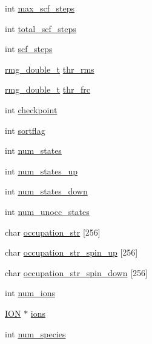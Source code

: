 \begin{DoxyCompactItemize}
int \hyperlink{struct_c_o_n_t_r_o_l_adf06946f4c5be0a3a3604fcf997b128d}{max\-\_\-scf\-\_\-steps}
\item 
int \hyperlink{struct_c_o_n_t_r_o_l_a4fe6222071236e0c16e69bbd8119cce1}{total\-\_\-scf\-\_\-steps}
\item 
int \hyperlink{struct_c_o_n_t_r_o_l_aa6e26afb9102d861d0ee9cd3f8bce47e}{scf\-\_\-steps}
\item 
\hyperlink{rmgtypes_8h_aaa16921c14f121c56eaa42390a340db8}{rmg\-\_\-double\-\_\-t} \hyperlink{struct_c_o_n_t_r_o_l_a9f27da44edf8c8ff3c58e0d905165717}{thr\-\_\-rms}
\item 
\hyperlink{rmgtypes_8h_aaa16921c14f121c56eaa42390a340db8}{rmg\-\_\-double\-\_\-t} \hyperlink{struct_c_o_n_t_r_o_l_a9851505740d1425250e946b86f8abcb5}{thr\-\_\-frc}
\item 
int \hyperlink{struct_c_o_n_t_r_o_l_ada7427151d7ea3e74bcb46b0bc913330}{checkpoint}
\item 
int \hyperlink{struct_c_o_n_t_r_o_l_ae0f5f57f1562c67d0f349bcbc2248de8}{sortflag}
\item 
int \hyperlink{struct_c_o_n_t_r_o_l_a840c358f050f3f94b1543821ef153c24}{num\-\_\-states}
\item 
int \hyperlink{struct_c_o_n_t_r_o_l_a9992a83dd0560b09aad1e8abff3fb6e7}{num\-\_\-states\-\_\-up}
\item 
int \hyperlink{struct_c_o_n_t_r_o_l_a9a9c9052fe7ae6ba32e09244e4e3c155}{num\-\_\-states\-\_\-down}
\item 
int \hyperlink{struct_c_o_n_t_r_o_l_acd75ceb26f9b224733acad0a2ede5db0}{num\-\_\-unocc\-\_\-states}
\item 
char \hyperlink{struct_c_o_n_t_r_o_l_a20005f8e37d21588823aae37905b0a65}{occupation\-\_\-str} \mbox{[}256\mbox{]}
\item 
char \hyperlink{struct_c_o_n_t_r_o_l_a225ce9277ba4d8e6d0c57a32f6fdef90}{occupation\-\_\-str\-\_\-spin\-\_\-up} \mbox{[}256\mbox{]}
\item 
char \hyperlink{struct_c_o_n_t_r_o_l_a109cd692994e69b902029d1786c6379e}{occupation\-\_\-str\-\_\-spin\-\_\-down} \mbox{[}256\mbox{]}
\item 
int \hyperlink{struct_c_o_n_t_r_o_l_a39439a931b27ec73d131eb225512ce3f}{num\-\_\-ions}
\item 
\hyperlink{struct_i_o_n}{I\-O\-N} $\ast$ \hyperlink{struct_c_o_n_t_r_o_l_af149457d11136020812fe56356c6903c}{ions}
\item 
int \hyperlink{struct_c_o_n_t_r_o_l_a8bf38d086662656293c413d3a13ece71}{num\-\_\-species}
\item 

\end{DoxyCompactItemize}
